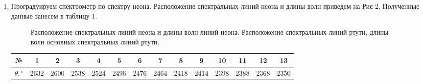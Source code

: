 \documentclass[a4paper, 12pt]{article}%
\begin{document}
	\begin{enumerate}
		
		\item Проградуируем спектрометр по спектру неона. Расположение спектральных линий неона и длины волн приведем на Рис 2. Полученные данные занесем в таблицу 1.
		
		\begin{figure}[H]
			\caption{Расположение спектральных линий неона и длины волн линий неона. Расположение спектральных линий ртути, длины волн основных спектральных линий ртути.}
		\end{figure}
		
		\begin{longtable}{|c|c|c|c|c|c|c|c|c|c|c|c|c|c|}
			\hline
			№ & 1 & 2 & 3 & 4 & 5 & 6 & 7 & 8 & 9 & 10 & 11 & 12 & 13 \\ \hline
			$\theta, {}^\circ$ & 2632 & 2600 & 2538 & 2524 & 2496 & 2476 & 2464 & 2418 & 2414 & 2398 & 2388 & 2368 & 2350 \\ \hline
			

\end{longtable}
\end{enumerate}
\end{document}
